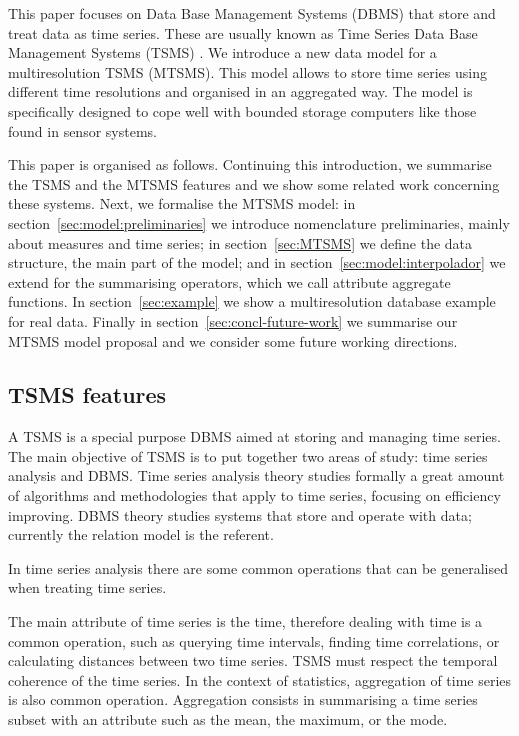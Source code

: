 
This paper focuses on Data Base Management Systems (DBMS) that store
and treat data as time series. These are usually known as Time Series
Data Base Management Systems (TSMS) \cite{dreyer94}.  We introduce a
new data model for a multiresolution TSMS (MTSMS). This model allows
to store time series using different time resolutions and organised in
an aggregated way. The model is specifically designed to cope well
with bounded storage computers like those found in sensor systems.


This paper is organised as follows. Continuing this introduction, we
summarise the TSMS and the MTSMS features and we show some related
work concerning these systems.  Next, we formalise the MTSMS model: in
section~\ref{sec:model:preliminaries} we introduce nomenclature
preliminaries, mainly about measures and time series; in
section~\ref{sec:MTSMS} we define the data structure, the main part of
the model; and in section~\ref{sec:model:interpolador} we extend for
the summarising operators, which we call attribute aggregate
functions. In section~\ref{sec:example} we show a multiresolution
database example for real data. Finally in
section~\ref{sec:concl-future-work} we summarise our MTSMS model
proposal and we consider some future working directions.



\subsection{TSMS features}

A TSMS is a special purpose DBMS aimed at storing and managing time
series. The main objective of TSMS is to put together two areas of study: time
series analysis and DBMS.  Time series analysis theory studies
formally a great amount of algorithms and methodologies that apply to
time series, focusing on efficiency improving. DBMS theory studies
systems that store and operate with data; currently the relation model
\cite{date:introduction} is the referent.

In time series analysis there are some common operations that can be
generalised when treating time series.

The main attribute of time series is the time, therefore dealing with
time is a common operation, such as querying time intervals, finding
time correlations, or calculating distances between two time
series. TSMS must respect the temporal coherence of the time series.
In the context of statistics, aggregation of time series is also
common operation. Aggregation consists in summarising a time series
subset with an attribute such as the mean, the maximum, or the mode.


